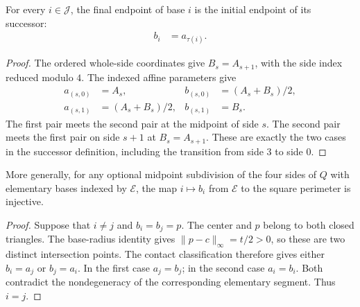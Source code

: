 \begin{lemma}
    \label{thm:area_law_cell_fan_successor_endpoints}
    \leanok
    For every $i\in\mathcal J$, the final endpoint of base $i$ is
    the initial endpoint of its successor:
    \begin{align}
        b_i & =a_{\tau(i)}.
    \end{align}
\end{lemma}
\begin{proof}\leanok
    The ordered whole-side coordinates give $B_s=A_{s+1}$, with the
    side index reduced modulo $4$. The indexed affine parameters give
    \begin{align}
        a_{(s,0)} & =A_s,         & b_{(s,0)} & =(A_s+B_s)/2, \\
        a_{(s,1)} & =(A_s+B_s)/2, & b_{(s,1)} & =B_s.
    \end{align}
    The first pair meets the second pair at the midpoint of side $s$.
    The second pair meets the first pair on side $s+1$ at $B_s=A_{s+1}$.
    These are exactly the two cases in the successor definition,
    including the transition from side $3$ to side $0$.
\end{proof}

\begin{lemma}
    \label{thm:area_law_cell_fan_final_endpoint_injective}
    \leanok
    More generally, for any optional midpoint subdivision of the
    four sides of $Q$ with elementary bases indexed by $\mathcal E$,
    the map $i\mapsto b_i$ from $\mathcal E$ to the square perimeter
    is injective.
\end{lemma}
\begin{proof}\leanok
    Suppose that $i\ne j$ and $b_i=b_j=p$. The center and $p$ belong
    to both closed triangles. The base-radius identity gives
    $\|p-c\|_\infty=t/2>0$, so these are two distinct intersection
    points. The contact classification therefore gives either
    $b_i=a_j$ or $b_j=a_i$. In the first case $a_j=b_j$; in the
    second case $a_i=b_i$. Both contradict the nondegeneracy of the
    corresponding elementary segment. Thus $i=j$.
\end{proof}


